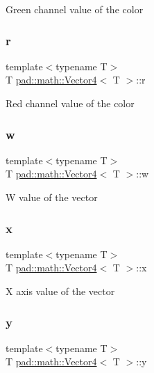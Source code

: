 Green channel value of the color \mbox{\label{structpad_1_1math_1_1_vector4_a2288e82eaf6dd6c283f4714503b13096}} 
\subsubsection{\texorpdfstring{r}{r}}
{\footnotesize\ttfamily template$<$typename T$>$ \\
T \mbox{\hyperlink{structpad_1_1math_1_1_vector4}{pad\+::math\+::\+Vector4}}$<$ T $>$\+::r}

Red channel value of the color \mbox{\label{structpad_1_1math_1_1_vector4_abbbd617d5083a886936724282216bee4}} 
\subsubsection{\texorpdfstring{w}{w}}
{\footnotesize\ttfamily template$<$typename T$>$ \\
T \mbox{\hyperlink{structpad_1_1math_1_1_vector4}{pad\+::math\+::\+Vector4}}$<$ T $>$\+::w}

W value of the vector \mbox{\label{structpad_1_1math_1_1_vector4_a977619c0dbd2e7060bb1f839d3fa8337}} 
\subsubsection{\texorpdfstring{x}{x}}
{\footnotesize\ttfamily template$<$typename T$>$ \\
T \mbox{\hyperlink{structpad_1_1math_1_1_vector4}{pad\+::math\+::\+Vector4}}$<$ T $>$\+::x}

X axis value of the vector \mbox{\label{structpad_1_1math_1_1_vector4_a2461711530968b1c7c5ff1256a5a6098}} 
\subsubsection{\texorpdfstring{y}{y}}
{\footnotesize\ttfamily template$<$typename T$>$ \\
T \mbox{\hyperlink{structpad_1_1math_1_1_vector4}{pad\+::math\+::\+Vector4}}$<$ T $>$\+::y}

